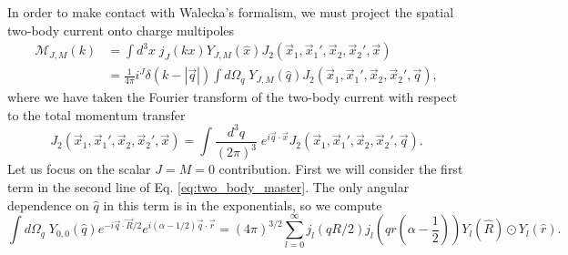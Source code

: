 \documentclass{book}[12pt]
\begin{document}
In order to make contact with Walecka's formalism, we must project the spatial two-body current onto charge multipoles
\begin{equation}
\begin{split}
\mathcal{M}_{J,M}(k)&=\int d^3x \;j_J(kx)Y_{J,M}(\hat{x})J_2(\vec{x}_1,\vec{x}_1',\vec{x}_2,\vec{x}_2',\vec{x})\\
&=\frac{1}{4\pi}i^J\delta(k-|\vec{q}|)\int d\Omega_q\; Y_{J,M}(\hat{q})J_2(\vec{x}_1,\vec{x}_1',\vec{x}_2,\vec{x}_2',\vec{q}),
\end{split}
\end{equation}
where we have taken the Fourier transform of the two-body current with respect to the total momentum transfer
\begin{equation}
J_2(\vec{x}_1,\vec{x}_1',\vec{x}_2,\vec{x}_2',\vec{x})=\int \frac{d^3q}{(2\pi)^3} \;e^{i\vec{q}\cdot\vec{x}}J_2(\vec{x}_1,\vec{x}_1',\vec{x}_2,\vec{x}_2',\vec{q}).
\end{equation}
Let us focus on the scalar $J=M=0$ contribution. First we will consider the first term in the second line of Eq. \ref{eq:two_body_master}. The only angular dependence on $\hat{q}$ in this term is in the exponentials, so we compute
\begin{equation}
\int d\Omega_q\;Y_{0,0}(\hat{q})e^{-i\vec{q}\cdot\vec{R}/2}e^{i(\alpha-1/2)\vec{q}\cdot\vec{r}}=(4\pi)^{3/2}\sum_{l=0}^{\infty}j_l(qR/2)j_l\left(qr(\alpha-\frac{1}{2})\right)Y_l(\hat{R})\odot Y_l(\hat{r}).
\end{equation}
\end{document}
